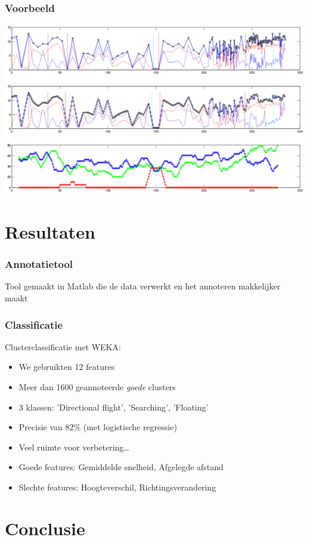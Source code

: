\documentclass{beamer}
\newcommand{\slide}[2]
{
\begin{frame}
\frametitle{#1} 

#2

\end{frame}
}
\begin{document}
\begin{frame}
\frametitle{Voorbeeld}
\includegraphics[width=\textwidth]{clusteringPicture}
\end{frame}


\section{Resultaten}
\slide{Annotatietool}
{
	Tool gemaakt in Matlab die de data verwerkt en het annoteren makkelijker maakt
}

\slide{Classificatie}
{
Clusterclassificatie met WEKA:
\begin{itemize}
    \item We gebruikten 12 features
    \item Meer dan 1600 geannoteerde \emph{goede} clusters
    \item 3 klassen: 'Directional flight', 'Searching', 'Floating'
    \item Precisie van 82\% (met logistische regressie)
    \item Veel ruimte voor verbetering\ldots
\end{itemize}
\vspace{1cm}
\begin{itemize}
\item Goede features: Gemiddelde snelheid, Afgelegde afstand
\item Slechte features: Hoogteverschil, Richtingsverandering
\end{itemize}
}

\section{Conclusie}
\end{document}
